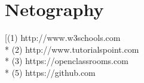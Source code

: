 \chapter{Netography}
[(1) http://www.w3schools.com 
\\*
(2) http://www.tutorialspoint.com
\\*
(3) https://openclassrooms.com 
\\*
(5) https://github.com
 
